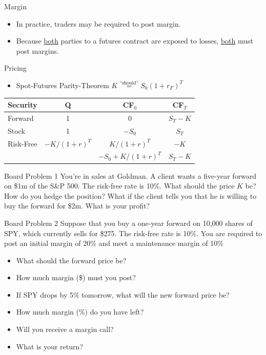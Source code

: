 \documentclass{beamer}
\begin{document}
\begin{frame}{Margin}
\begin{itemize}
\item In practice, traders may be required to post margin. 
\item Because \underline{both} parties to a futures contract are exposed to losses, \underline{both} must post margins. 
\end{itemize}
\end{frame}

\begin{frame}{Pricing}
\begin{itemize}
    \item Spot-Futures Parity-Theorem $K\overset{\text{``should''}}{=}S_{0}(1+r_{F})^{T}$
\end{itemize}
    \begin{center}
        \begin{tabular}{lccc}
            Security & Q & CF$_{0}$ & CF$_{T}$ \\ \hline
            Forward & 1 & 0 & $S_{T}-K$ \\ \hline\hline
            Stock & 1 & $-S_{0}$ & $S_{T}$ \\
            Risk-Free & $-K/(1+r)^{T}$ & $K/(1+r)^{T}$ & $-K$ \\ \hline
            & & $-S_{0}+K/(1+r)^{T}$ & $S_{T}-K$
        \end{tabular}
    \end{center}
\end{frame}

\begin{frame}{Board Problem 1}
    You're in sales at Goldman. A client wants a five-year forward on \$1m of the S\&P 500. The risk-free rate is 10\%. What should the price $K$ be? How do you hedge the position? What if the client tells you that he is willing to buy the forward for \$2m. What is your profit?  
\end{frame}

\begin{frame}{Board Problem 2}
Suppose that you buy a one-year forward on 10,000 shares of SPY, which currently sells for \$275. The risk-free rate is 10\%. You are required to post an initial margin of 20\% and meet a maintenance margin of 10\%
\begin{itemize}
    \item What should the forward price be? 
    \item How much margin (\$) must you post?  
    \item If SPY drops by 5\% tomorrow, what will the new forward price be?           
    \item How much margin (\%) do you have left? 
    \item Will you receive a margin call?  
    \item What is your return?
\end{itemize}
\end{frame}
\end{document}
